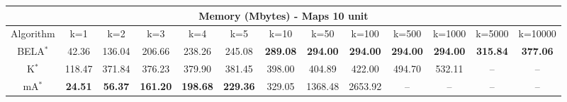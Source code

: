 \begin{tabular}{c|cccccccccccc}\toprule
\multicolumn{13}{c}{Memory (Mbytes) - Maps 10 unit}\\ \midrule
Algorithm & k=1 & k=2 & k=3 & k=4 & k=5 & k=10 & k=50 & k=100 & k=500 & k=1000 & k=5000 & k=10000 \\ \midrule
BELA$^*$ & 42.36 & 136.04 & 206.66 & 238.26 & 245.08 & \textbf{289.08} & \textbf{294.00} & \textbf{294.00} & \textbf{294.00} & \textbf{294.00} & \textbf{315.84} & \textbf{377.06} \\
K$^*$ & 118.47 & 371.84 & 376.23 & 379.90 & 381.45 & 398.00 & 404.89 & 422.00 & 494.70 & 532.11 & -- & -- \\
mA$^*$ & \textbf{24.51} & \textbf{56.37} & \textbf{161.20} & \textbf{198.68} & \textbf{229.36} & 329.05 & 1368.48 & 2653.92 & -- & -- & -- & -- \\ \bottomrule 
\end{tabular}
